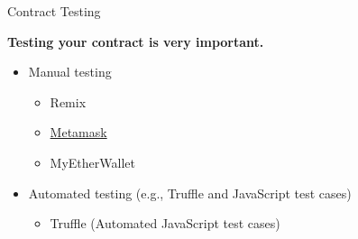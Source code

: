 \documentclass[]{beamer}
\begin{document}
\begin{frame}{Contract Testing}

	\begin{figure}
		\begingroup
			
		\endgroup
	\end{figure}
		
	\textbf{Testing your contract is very important.}\\
	
	\begin{itemize}
		\item<2-> Manual testing
		\begin{itemize}
			\item<2-> Remix
			\item<2-> \href{https://metamask.io}{\link Metamask}
			\item<2-> MyEtherWallet
		\end{itemize}
		\item<3-> Automated testing (e.g., Truffle and JavaScript test cases)
		\begin{itemize}
			\item<3-> Truffle (Automated JavaScript test cases)
		\end{itemize}
	\end{itemize}
\end{frame}

%	
%	
\end{document}
